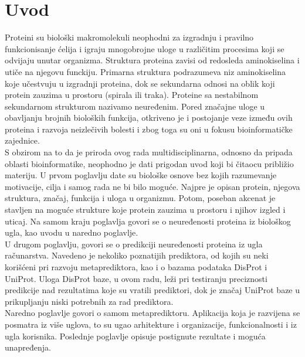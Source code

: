 
\chapter*{Uvod} %

\label{Chapter1} %


Proteini su biološki makromolekuli neophodni za izgradnju i pravilno funkcionisanje ćelija i igraju mnogobrojne uloge u različitim procesima koji se odvijaju unutar organizma. Struktura proteina zavisi od redosleda aminokiselina i utiče na njegovu funckiju. Primarna struktura podrazumeva niz aminokiselina koje učestvuju u izgradnji proteina, dok se sekundarna odnosi na oblik koji protein zauzima u prostoru (spirala ili traka). Proteine sa nestabilnom sekundarnom strukturom nazivamo neuređenim. Pored značajne uloge u obavljanju brojnih bioloških funkcija, otkriveno je i postojanje veze između ovih proteina i razvoja neizlečivih bolesti i zbog toga su oni u fokusu bioinformatičke zajednice.\\

S obzirom na to da je priroda ovog rada multidisciplinarna, odnosno da pripada oblasti bioinformatike, neophodno je dati prigodan uvod koji bi čitaocu približio materiju. U prvom poglavlju date su biološke osnove bez kojih razumevanje motivacije, cilja i samog rada ne bi bilo moguće. Najpre je opisan protein, njegova struktura, značaj, funkcija i uloga u organizmu. Potom, poseban akcenat je stavljen na moguće strukture koje protein zauzima u prostoru i njihov izgled i uticaj. Na samom kraju poglavlja govori se o neuređenosti proteina iz biološkog ugla, kao uvodu u naredno poglavlje. \\

U drugom poglavlju, govori se o predikciji neuređenosti proteina iz ugla računarstva. Navedeno je nekoliko poznatijih prediktora, od kojih su neki  korišćeni pri razvoju metaprediktora, kao i o bazama podataka DisProt i UniProt. Uloga DisProt baze, u ovom radu, leži pri testiranju preciznosti predikcije nad rezultatima koje su vratili prediktori, dok je značaj UniProt baze u prikupljanju niski potrebnih za rad prediktora.\\

Naredno poglavlje govori o samom metaprediktoru. Aplikacija koja je razvijena se posmatra iz više uglova, to su ugao arhitekture i organizacije, funkcionalnosti i iz ugla korisnika. Poslednje poglavlje opisuje postignute rezultate i moguća unapređenja.




